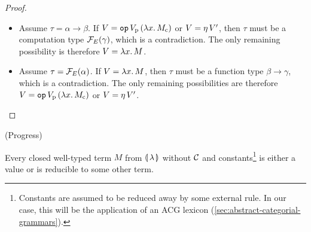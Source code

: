 \begin{proof}\hspace{1cm}

  \begin{itemize}
  \item Assume $\tau = \alpha \to \beta$. If
    $V = \mathtt{op}\,V_{\mathrm{p}}\,(\lambda x.\, M_{\mathrm{c}})$ or
    $V = \eta\,V'$, then $\tau$ must be a computation type
    $\mathcal{F}_E(\gamma)$, which is a contradiction. The only remaining
    possibility is therefore $V = \lambda x.\, M$.
  \item Assume $\tau = \mathcal{F}_E(\alpha)$. If $V = \lambda x.\, M$, then $\tau$
    must be a function type $\beta \to \gamma$, which is a
    contradiction. The only remaining possibilities are therefore
    $V = \mathtt{op}\,V_{\mathrm{p}}\,(\lambda x.\, M_{\mathrm{c}})$ or
    $V = \eta\,V'$.
  \end{itemize}
\end{proof}

\begin{property}\label{prop:progress}
  (Progress) 

  Every closed well-typed term $M$ from $\llparenthesis \, \lambda \, \rrparenthesis$ without $\mathcal{C}$
  and constants\footnote{Constants are assumed to be reduced away by some
    external rule. In our case, this will be the application of an ACG
    lexicon (\ref{sec:abstract-categorial-grammars}).} is either a value or
  is reducible to some other term.
\end{property}

